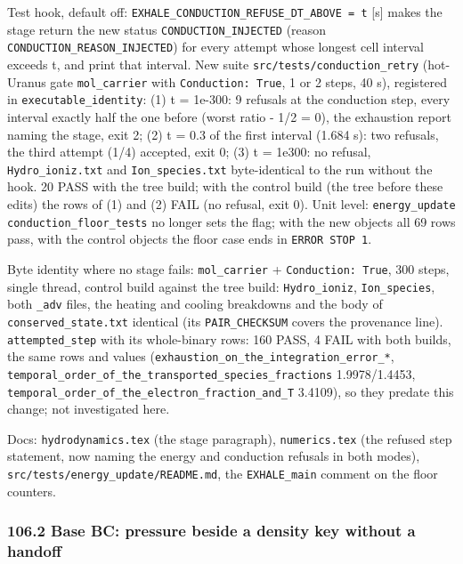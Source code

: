 \documentclass[english,a4paper]{my_memo}
\begin{document}
Test hook, default off: \texttt{EXHALE\_CONDUCTION\_REFUSE\_DT\_ABOVE\ =\ t} {[}s{]} makes the
stage return the new status \texttt{CONDUCTION\_INJECTED} (reason
\texttt{CONDUCTION\_REASON\_INJECTED}) for every attempt whose longest cell interval
exceeds t, and print that interval. New suite \texttt{src/tests/conduction\_retry}
(hot-Uranus gate \texttt{mol\_carrier} with \texttt{Conduction:\ True}, 1 or 2 steps, 40 s),
registered in \texttt{executable\_identity}: (1) t = 1e-300: 9 refusals at the
conduction step, every interval exactly half the one before (worst
\textbar ratio - 1/2\textbar{} = 0), the exhaustion report naming the stage, exit 2; (2)
t = 0.3 of the first interval (1.684 s): two refusals, the third attempt
(1/4) accepted, exit 0; (3) t = 1e300: no refusal, \texttt{Hydro\_ioniz.txt} and
\texttt{Ion\_species.txt} byte-identical to the run without the hook. 20 PASS with the
tree build; with the control build (the tree before these edits) the rows of
(1) and (2) FAIL (no refusal, exit 0). Unit level: \texttt{energy\_update}
\texttt{conduction\_floor\_tests} no longer sets the flag; with the new objects all 69
rows pass, with the control objects the floor case ends in \texttt{ERROR\ STOP\ 1}.

Byte identity where no stage fails: \texttt{mol\_carrier} + \texttt{Conduction:\ True}, 300
steps, single thread, control build against the tree build: \texttt{Hydro\_ioniz},
\texttt{Ion\_species}, both \texttt{\_adv} files, the heating and cooling breakdowns and the
body of \texttt{conserved\_state.txt} identical (its \texttt{PAIR\_CHECKSUM} covers the
provenance line). \texttt{attempted\_step} with its whole-binary rows: 160 PASS,
4 FAIL with both builds, the same rows and values
(\texttt{exhaustion\_on\_the\_integration\_error\_*},
\texttt{temporal\_order\_of\_the\_transported\_species\_fractions} 1.9978/1.4453,
\texttt{temporal\_order\_of\_the\_electron\_fraction\_and\_T} 3.4109), so they predate this
change; not investigated here.

Docs: \texttt{hydrodynamics.tex} (the stage paragraph), \texttt{numerics.tex} (the refused
step statement, now naming the energy and conduction refusals in both
modes), \texttt{src/tests/energy\_update/README.md}, the \texttt{EXHALE\_main} comment on the
floor counters.

\subsubsection{106.2 Base BC: pressure beside a density key without a handoff}\label{1062-base-bc-pressure-beside-a-density-key-without-a-handoff}
\end{document}
